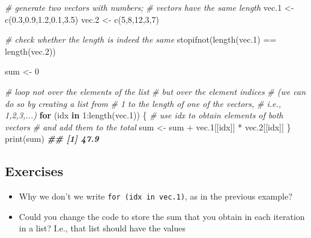 \documentclass[
]{book}
\newenvironment{Shaded}{\begin{snugshade}}{\end{snugshade}}
\newcommand{\CommentTok}[1]{\textcolor[rgb]{0.56,0.35,0.01}{\textit{#1}}}
\newcommand{\ControlFlowTok}[1]{\textcolor[rgb]{0.13,0.29,0.53}{\textbf{#1}}}
\newcommand{\DecValTok}[1]{\textcolor[rgb]{0.00,0.00,0.81}{#1}}
\newcommand{\DocumentationTok}[1]{\textcolor[rgb]{0.56,0.35,0.01}{\textbf{\textit{#1}}}}
\newcommand{\FloatTok}[1]{\textcolor[rgb]{0.00,0.00,0.81}{#1}}
\newcommand{\FunctionTok}[1]{\textcolor[rgb]{0.00,0.00,0.00}{#1}}
\newcommand{\NormalTok}[1]{#1}
\newcommand{\OtherTok}[1]{\textcolor[rgb]{0.56,0.35,0.01}{#1}}
\newcommand{\SpecialCharTok}[1]{\textcolor[rgb]{0.00,0.00,0.00}{#1}}
\providecommand{\tightlist}{%
  \setlength{\itemsep}{0pt}\setlength{\parskip}{0pt}}
\begin{document}
\begin{Shaded}
\begin{Highlighting}[]
\CommentTok{\# generate two vectors with numbers; }
\CommentTok{\# vectors have the same length}
\NormalTok{vec}\FloatTok{.1} \OtherTok{\textless{}{-}} \FunctionTok{c}\NormalTok{(}\FloatTok{0.3}\NormalTok{,}\FloatTok{0.9}\NormalTok{,}\FloatTok{1.2}\NormalTok{,}\FloatTok{0.1}\NormalTok{,}\FloatTok{3.5}\NormalTok{)}
\NormalTok{vec}\FloatTok{.2} \OtherTok{\textless{}{-}} \FunctionTok{c}\NormalTok{(}\DecValTok{5}\NormalTok{,}\DecValTok{8}\NormalTok{,}\DecValTok{12}\NormalTok{,}\DecValTok{3}\NormalTok{,}\DecValTok{7}\NormalTok{)}

\CommentTok{\# check whether the length is indeed the same}
\FunctionTok{stopifnot}\NormalTok{(}\FunctionTok{length}\NormalTok{(vec}\FloatTok{.1}\NormalTok{) }\SpecialCharTok{==} \FunctionTok{length}\NormalTok{(vec}\FloatTok{.2}\NormalTok{))}

\NormalTok{sum }\OtherTok{\textless{}{-}} \DecValTok{0}

\CommentTok{\# loop not over the elements of the list}
\CommentTok{\# but over the element indices}
\CommentTok{\# (we can do so by creating a list from }
\CommentTok{\# 1 to the length of one of the vectors,}
\CommentTok{\# i.e., 1,2,3,...)}
\ControlFlowTok{for}\NormalTok{ (idx }\ControlFlowTok{in} \DecValTok{1}\SpecialCharTok{:}\FunctionTok{length}\NormalTok{(vec}\FloatTok{.1}\NormalTok{))}
\NormalTok{\{}
    \CommentTok{\# use idx to obtain elements of both vectors}
    \CommentTok{\# and add them to the total}
\NormalTok{    sum }\OtherTok{\textless{}{-}}\NormalTok{ sum }\SpecialCharTok{+} 
\NormalTok{        vec}\FloatTok{.1}\NormalTok{[[idx]] }\SpecialCharTok{*}\NormalTok{ vec}\FloatTok{.2}\NormalTok{[[idx]]}
\NormalTok{\}}
\FunctionTok{print}\NormalTok{(sum)}
\DocumentationTok{\#\# [1] 47.9}
\end{Highlighting}
\end{Shaded}

\hypertarget{exercises-1}{%
\subsection{Exercises}\label{exercises-1}}

\begin{itemize}
\tightlist
\item
  Why we don't we write \texttt{for\ (idx\ in\ vec.1)}, as in the previous example?
\item
  Could you change the code to store the sum that you obtain
  in each iteration in a list? I.e., that list should have the values
\end{itemize}
\end{document}
